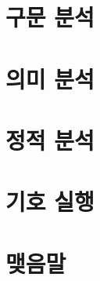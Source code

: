 \documentclass[a4paper]{book}
\begin{document}


\chapter{구문 분석}

\chapter{의미 분석}

\chapter{정적 분석}

\chapter{기호 실행}

\chapter{맺음말}
\end{document}
